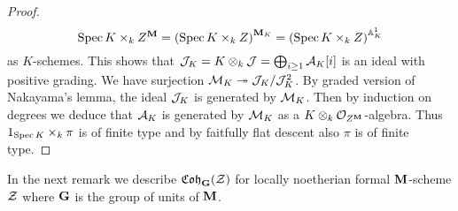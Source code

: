 \begin{proof}
$$\mathrm{Spec}\, K\times_k Z^{\mathbf{M}} = \left(\mathrm{Spec}\, K \times_k Z\right)^{\mathbf{M}_K} = \left(\mathrm{Spec}\, K \times_k Z\right)^{\mathbb{A}^1_K}$$
as $K$-schemes. This shows that ${\mathcal J}_K = K\otimes_k{\mathcal J} = \bigoplus_{i\geq 1} {\mathcal A}_K[i]$ is an ideal with positive grading. We have surjection ${\mathcal M}_K\twoheadrightarrow {\mathcal J}_K/{\mathcal J}_K^2$. By graded version of Nakayama's lemma, the ideal ${\mathcal J}_K$  is generated by ${\mathcal M}_K$. Then by induction on degrees we deduce that ${\mathcal A}_K$ is generated by ${\mathcal M}_K$ as a $K\otimes_k{\mathcal O}_{Z^{\mathbf{M}}}$-algebra. Thus $1_{\mathrm{Spec}\, K}\times_k\pi$ is of finite type and by faitfully flat descent also $\pi$ is of finite type.
\end{proof}
\noindent
In the next remark we describe $\mathfrak{Coh}_{\mathbf{G}}({\mathcal Z})$ for locally noetherian formal $\mathbf{M}$-scheme ${\mathcal Z}$ where $\mathbf{G}$ is the group of units of $\mathbf{M}$.

